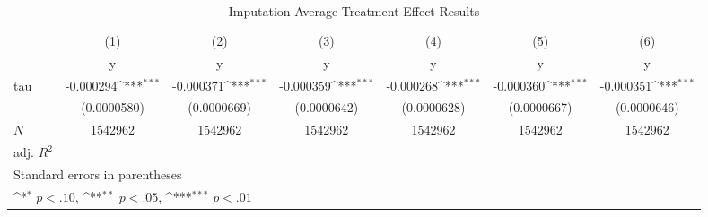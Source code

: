 \begin{table}[htbp]\centering
\def\sym#1{\ifmmode^{#1}\else\(^{#1}\)\fi}
\caption{Imputation Average Treatment Effect Results}
\begin{tabular}{l*{6}{c}}
\hline\hline
            &\multicolumn{1}{c}{(1)}&\multicolumn{1}{c}{(2)}&\multicolumn{1}{c}{(3)}&\multicolumn{1}{c}{(4)}&\multicolumn{1}{c}{(5)}&\multicolumn{1}{c}{(6)}\\
            &\multicolumn{1}{c}{y}&\multicolumn{1}{c}{y}&\multicolumn{1}{c}{y}&\multicolumn{1}{c}{y}&\multicolumn{1}{c}{y}&\multicolumn{1}{c}{y}\\
\hline
tau         &   -0.000294\sym{***}&   -0.000371\sym{***}&   -0.000359\sym{***}&   -0.000268\sym{***}&   -0.000360\sym{***}&   -0.000351\sym{***}\\
            & (0.0000580)         & (0.0000669)         & (0.0000642)         & (0.0000628)         & (0.0000667)         & (0.0000646)         \\
\hline
\(N\)       &     1542962         &     1542962         &     1542962         &     1542962         &     1542962         &     1542962         \\
adj. \(R^{2}\)&                     &                     &                     &                     &                     &                     \\
\hline\hline
\multicolumn{7}{l}{\footnotesize Standard errors in parentheses}\\
\multicolumn{7}{l}{\footnotesize \sym{*} \(p<.10\), \sym{**} \(p<.05\), \sym{***} \(p<.01\)}\\
\end{tabular}
\end{table}
